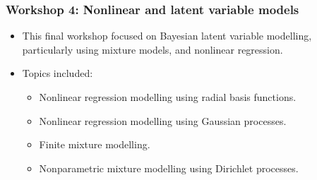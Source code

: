 \begin{frame}
	\frametitle{Workshop 4: Nonlinear and latent variable models}

	\begin{itemize}
		\item This final workshop focused on Bayesian latent variable modelling, particularly using mixture models, and nonlinear regression.
		\item Topics included:
			\begin{itemize}
				\item Nonlinear regression modelling using radial basis functions. 
				\item Nonlinear regression modelling using Gaussian processes.
				\item Finite mixture modelling.
				\item Nonparametric mixture modelling using Dirichlet processes. 
			\end{itemize}


	\end{itemize}

\end{frame}
